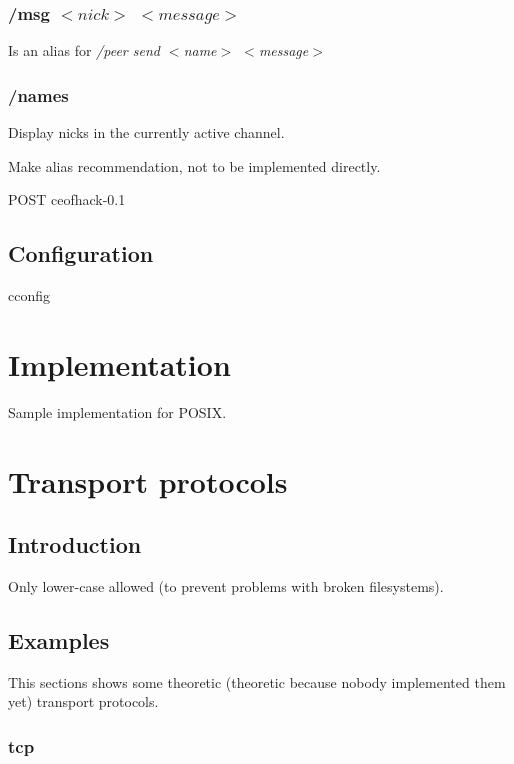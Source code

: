 \documentclass[12pt,a4paper]{book}
\begin{document}
\subsection{/msg $<nick>$ $<message>$}
Is an alias for \textit{/peer send $<$name$>$ $<$message$>$}
\subsection{/names}
Display nicks in the currently active channel.

Make alias recommendation, not to be implemented directly.

POST ceofhack-0.1
\section{Configuration}
cconfig
\chapter{Implementation}
Sample implementation for POSIX.

\chapter{Transport protocols}
\section{Introduction}
Only lower-case allowed (to prevent problems with broken filesystems).
\section{Examples}
This sections shows some theoretic (theoretic because nobody implemented
them yet) transport protocols.
\subsection{tcp}
\end{document}
